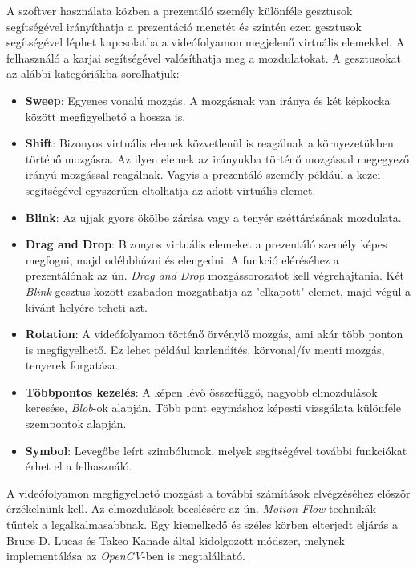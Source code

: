 

A szoftver használata közben a prezentáló személy különféle gesztusok segítségével irányíthatja a prezentáció menetét és szintén ezen gesztusok segítségével léphet kapcsolatba a videófolyamon megjelenő virtuális elemekkel. A felhasználó a karjai segítségével valósíthatja meg a mozdulatokat. A gesztusokat az alábbi kategóriákba sorolhatjuk:

\begin{itemize}
	\item \textbf{Sweep}: Egyenes vonalú mozgás. A mozgásnak van iránya és két képkocka között megfigyelhető a hossza is.
	\item \textbf{Shift}: Bizonyos virtuális elemek közvetlenül is reagálnak a környezetükben történő mozgásra. Az ilyen elemek az irányukba történő mozgással megegyező irányú mozgással reagálnak. Vagyis a prezentáló személy például a kezei segítségével egyszerűen eltolhatja az adott virtuális elemet.
	\item \textbf{Blink}: Az ujjak gyors ökölbe zárása vagy a tenyér széttárásának mozdulata.
	\item \textbf{Drag and Drop}: Bizonyos virtuális elemeket a prezentáló személy képes megfogni, majd odébbhúzni és elengedni. A funkció eléréséhez a prezentálónak az ún. \textit{Drag and Drop} mozgássorozatot kell végrehajtania. Két \textit{Blink} gesztus között szabadon mozgathatja az "elkapott" elemet, majd végül a kívánt helyére teheti azt.
	\item \textbf{Rotation}: A videófolyamon történő örvénylő mozgás, ami akár több ponton is megfigyelhető. Ez lehet például karlendítés, körvonal/ív menti mozgás, tenyerek forgatása.
	\item \textbf{Többpontos kezelés}: A képen lévő összefüggő, nagyobb elmozdulások keresése, \textit{Blob}-ok alapján. Több pont egymáshoz képesti vizsgálata különféle szempontok alapján.
	\item \textbf{Symbol}: Levegőbe leírt szimbólumok, melyek segítségével további funkciókat érhet el a felhasználó.
\end{itemize}



A videófolyamon megfigyelhető mozgást a további számítások elvégzéséhez először érzékelnünk kell. Az elmozdulások becslésére az ún. \textit{Motion-Flow} technikák tűntek a legalkalmasabbnak. Egy kiemelkedő és széles körben elterjedt eljárás a Bruce D. Lucas és Takeo Kanade által kidolgozott módszer, melynek implementálása az \textit{OpenCV}-ben is megtalálható.

